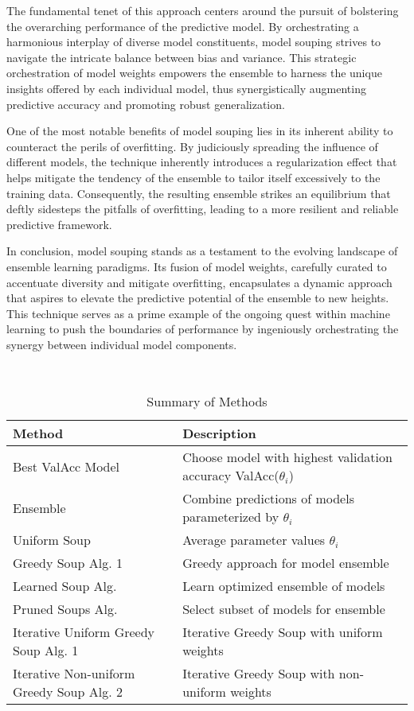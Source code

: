 \documentclass[10pt,twocolumn,letterpaper]{article}
\begin{document}
The fundamental tenet of this approach centers around the pursuit of bolstering the overarching performance of the predictive model. By orchestrating a harmonious interplay of diverse model constituents, model souping strives to navigate the intricate balance between bias and variance. This strategic orchestration of model weights empowers the ensemble to harness the unique insights offered by each individual model, thus synergistically augmenting predictive accuracy and promoting robust generalization.

One of the most notable benefits of model souping lies in its inherent ability to counteract the perils of overfitting. By judiciously spreading the influence of different models, the technique inherently introduces a regularization effect that helps mitigate the tendency of the ensemble to tailor itself excessively to the training data. Consequently, the resulting ensemble strikes an equilibrium that deftly sidesteps the pitfalls of overfitting, leading to a more resilient and reliable predictive framework.

In conclusion, model souping stands as a testament to the evolving landscape of ensemble learning paradigms. Its fusion of model weights, carefully curated to accentuate diversity and mitigate overfitting, encapsulates a dynamic approach that aspires to elevate the predictive potential of the ensemble to new heights. This technique serves as a prime example of the ongoing quest within machine learning to push the boundaries of performance by ingeniously orchestrating the synergy between individual model components.






\begin{table}[htbp]
\centering\
	
\small
\begin{tabular}{p{3.5cm} p{8cm}}
		\toprule
		\textbf{Method} & \textbf{Description} \\
		\midrule
		Best ValAcc Model & Choose model with highest validation accuracy ValAcc($\theta_i$) \\
		Ensemble & Combine predictions of models parameterized by $\theta_i$ \\
		Uniform Soup & Average parameter values $\theta_i$ \\
		Greedy Soup Alg. 1 & Greedy approach for model ensemble \\
		Learned Soup Alg. & Learn optimized ensemble of models \\
		Pruned Soups Alg. & Select subset of models for ensemble \\
		Iterative Uniform Greedy Soup Alg. 1 & Iterative Greedy Soup with uniform weights \\
		Iterative Non-uniform Greedy Soup Alg. 2 & Iterative Greedy Soup with non-uniform weights \\
		\bottomrule
	\end{tabular}
	\caption{Summary of Methods}
\end{table}
\end{document}

